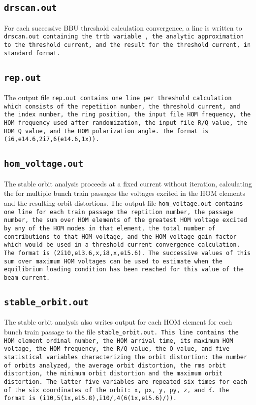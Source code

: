 \documentclass[11pt]{article}
\begin{document}
{\subsection{\tt{drscan.out}}
For each successive BBU threshold calculation convergence, a line is written
to \tt{drscan.out} containing the {tr\/tb} variable~\cite{ref:Hoffstaetter04},
the analytic approximation to the threshold current, and the result for the
threshold current, in standard format.
\subsection{\tt{rep.out}}
The output file \tt{rep.out} contains one line per threshold calculation which
consists of the repetition number, the threshold current, and the index number, the 
ring position, the input file HOM frequency, the HOM frequency used after randomization,
the input file \tt{R/Q} value, the HOM Q value, and the HOM polarization angle.
The format is \tt{(i6,e14.6,2i7,6(e14.6,1x))}.
\subsection{\tt{hom_voltage.out}}
The stable orbit analysis proceeds at a fixed current without iteration, calculating
the for multiple bunch train passages the voltages excited in the HOM elements and
the resulting orbit distortions. The output file \tt{hom_voltage.out} contains one
line for each train passage the reptition number, the passage number, the sum over HOM
elements of the greatest HOM voltage excited by any of the HOM modes in that element,
the total number of contributions to that HOM voltage, and the HOM voltage gain factor which
would be used in a threshold current convergence calculation.
The format is \tt{(2i10,e13.6,x,i8,x,e15.6)}. The successive values of this sum over
maximum HOM voltages can be used to estimate when the equilibrium loading condition has
been reached for this value of the beam current.
\subsection{\tt{stable_orbit.out}}
The stable orbit analysis also writes output for each HOM element for each bunch train passage to
the file \tt{stable_orbit.out}. This line contains the HOM element ordinal number, the HOM
arrival time, its maximum HOM voltage, the HOM frequency, the \tt{R/Q} value, the Q value, and five
statistical variables characterizing the orbit distortion: the number of orbits analyzed, the average orbit distortion, the rms orbit distortion, the minimum orbit distortion and the maximum orbit distortion. The latter five variables are repeated six times for each of the six coordinates of the orbit: x, px, y, py, z, and ${\delta}$. The format is \tt{(i10,5(1x,e15.8),i10/,4(6(1x,e15.6)/))}.
}
\end{document}

